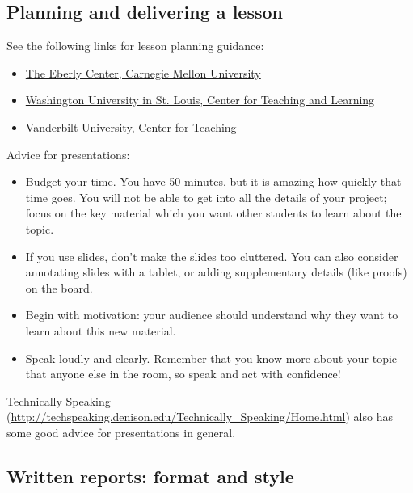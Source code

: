 \documentclass[11pt]{article}
\begin{document}
\subsection*{Planning and delivering a lesson}

See the following links for lesson planning guidance:

\begin{itemize}
\item \href{https://www.cmu.edu/teaching/designteach/teach/instructionalstrategies/lectures.html}{The Eberly Center, Carnegie Mellon University}

\item \href{https://ctl.wustl.edu/resource-category/instructional-strategies/}{Washington University in St. Louis, Center for Teaching and Learning}

\item \href{https://cft.vanderbilt.edu/teaching-guides/pedagogies-and-strategies/}{Vanderbilt University, Center for Teaching}
\end{itemize}

\noindent Advice for presentations:

\begin{itemize}
\item Budget your time. You have 50 minutes, but it is amazing how quickly that time goes. You will not be able to get into all the details of your project; focus on the key material which you want other students to learn about the topic.

\item If you use slides, don't make the slides too cluttered. You can also consider annotating slides with a tablet, or adding supplementary details (like proofs) on the board.

\item Begin with motivation: your audience should understand why they want to learn about this new material.

\item Speak loudly and clearly. Remember that you know more about your topic that anyone else in the room, so speak and act with confidence!
\end{itemize}

\noindent Technically Speaking (\url{http://techspeaking.denison.edu/Technically_Speaking/Home.html}) also has some good advice for presentations in general.

\subsection*{Written reports: format and style}
\end{document}

